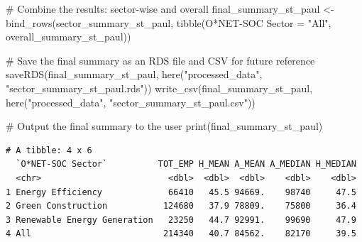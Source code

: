 \documentclass[
  letterpaper,
  DIV=11,
  numbers=noendperiod]{scrartcl}
\newenvironment{Shaded}{\begin{snugshade}}{\end{snugshade}}
\newcommand{\AttributeTok}[1]{\textcolor[rgb]{0.40,0.45,0.13}{#1}}
\newcommand{\CommentTok}[1]{\textcolor[rgb]{0.37,0.37,0.37}{#1}}
\newcommand{\FunctionTok}[1]{\textcolor[rgb]{0.28,0.35,0.67}{#1}}
\newcommand{\NormalTok}[1]{\textcolor[rgb]{0.00,0.23,0.31}{#1}}
\newcommand{\OtherTok}[1]{\textcolor[rgb]{0.00,0.23,0.31}{#1}}
\newcommand{\StringTok}[1]{\textcolor[rgb]{0.13,0.47,0.30}{#1}}
\begin{document}
\begin{Shaded}
\begin{Highlighting}[]
\CommentTok{\# Combine the results: sector{-}wise and overall}
\NormalTok{final\_summary\_st\_paul }\OtherTok{\textless{}{-}} \FunctionTok{bind\_rows}\NormalTok{(sector\_summary\_st\_paul, }\FunctionTok{tibble}\NormalTok{(}\StringTok{\textasciigrave{}}\AttributeTok{O*NET{-}SOC Sector}\StringTok{\textasciigrave{}} \OtherTok{=} \StringTok{"All"}\NormalTok{, overall\_summary\_st\_paul))}

\CommentTok{\# Save the final summary as an RDS file and CSV for future reference}
\FunctionTok{saveRDS}\NormalTok{(final\_summary\_st\_paul, }\FunctionTok{here}\NormalTok{(}\StringTok{"processed\_data"}\NormalTok{, }\StringTok{"sector\_summary\_st\_paul.rds"}\NormalTok{))}
\FunctionTok{write\_csv}\NormalTok{(final\_summary\_st\_paul, }\FunctionTok{here}\NormalTok{(}\StringTok{"processed\_data"}\NormalTok{, }\StringTok{"sector\_summary\_st\_paul.csv"}\NormalTok{))}

\CommentTok{\# Output the final summary to the user}
\FunctionTok{print}\NormalTok{(final\_summary\_st\_paul)}
\end{Highlighting}
\end{Shaded}

\begin{verbatim}
# A tibble: 4 x 6
  `O*NET-SOC Sector`          TOT_EMP H_MEAN A_MEAN A_MEDIAN H_MEDIAN
  <chr>                         <dbl>  <dbl>  <dbl>    <dbl>    <dbl>
1 Energy Efficiency             66410   45.5 94669.    98740     47.5
2 Green Construction           124680   37.9 78809.    75800     36.4
3 Renewable Energy Generation   23250   44.7 92991.    99690     47.9
4 All                          214340   40.7 84562.    82170     39.5
\end{verbatim}
\end{document}
